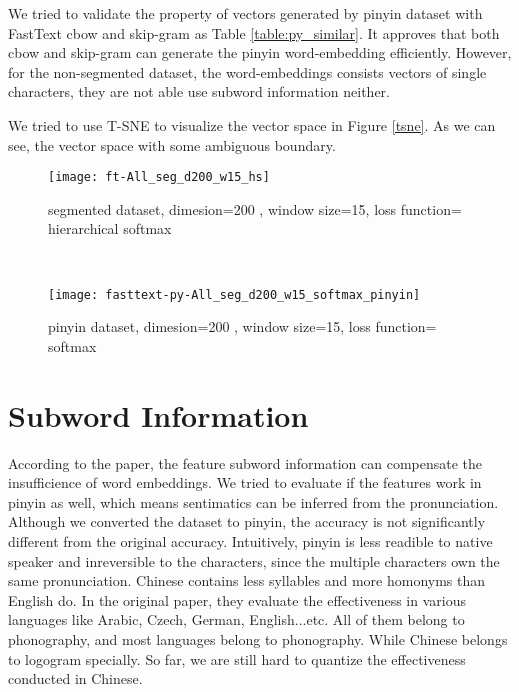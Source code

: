 We tried to validate the property of vectors generated by pinyin dataset with FastText cbow and skip-gram as Table \ref{table:py_similar}. 
It approves that both cbow and skip-gram can generate the pinyin word-embedding efficiently. 
However, for the non-segmented dataset, the word-embeddings consists vectors of single characters, they are not able use subword information neither.


We tried to use T-SNE to visualize the vector space in Figure \ref{tsne}. As we can see, the vector space with some ambiguous boundary.


\begin{figure*}[t!]
    \centering
     
    \begin{subfigure}[t]{0.5\textwidth}
        \centering
        \texttt{[image: ft-All\_seg\_d200\_w15\_hs]}
        \caption{segmented dataset, dimesion=200 , window size=15, loss function=  hierarchical softmax}
    \end{subfigure}%
    ~
    \begin{subfigure}[t]{0.5\textwidth}
        \centering
        \texttt{[image: fasttext-py-All\_seg\_d200\_w15\_softmax\_pinyin]}
        \caption{pinyin dataset,  dimesion=200 , window size=15, loss function= softmax}
    \end{subfigure}
    \caption{Visualization of vector space for 2 dataset}
    \label{tsne}
\end{figure*}

\section{Subword Information}

According to the paper, the feature subword information can compensate the insufficience of word embeddings. 
We tried to evaluate if the features work in pinyin as well, which means sentimatics can be inferred from the pronunciation. 
Although we converted the dataset to pinyin, the accuracy is not significantly different from the original accuracy. 
Intuitively, pinyin is less readible to native speaker and inreversible to the characters, since the multiple characters own the same pronunciation. 
Chinese contains less syllables and more homonyms than English do. In the original paper\cite{bojanowski2016enriching}, they evaluate the effectiveness in various languages like Arabic, Czech, German, English...etc.
All of them belong to phonography, and most languages belong to phonography. While Chinese belongs to logogram specially. So far, we are still hard to quantize the effectiveness conducted in Chinese.

